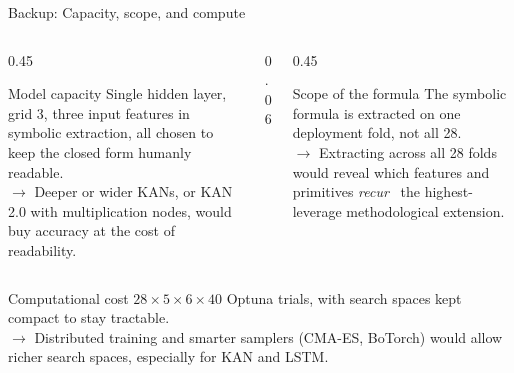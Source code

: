 \documentclass[aspectratio=169, t]{beamer}
\begin{document}

\begin{frame}{Backup: Capacity, scope, and compute}
\vspace{-0.4em}

\begin{columns}[T]
\begin{column}{0.45\textwidth}
{
\begin{block}{Model capacity}
\scriptsize
Single hidden layer, grid 3, three input features in symbolic extraction, all chosen to keep the closed form humanly readable.\\[3pt]
\textbf{$\rightarrow$} Deeper or wider KANs, or KAN 2.0 with multiplication nodes, would buy accuracy at the cost of readability.
\end{block}
}
\end{column}
\begin{column}{0.06\textwidth}\hfill\end{column}
\begin{column}{0.45\textwidth}
{
\begin{block}{Scope of the formula}
\scriptsize
The symbolic formula is extracted on one deployment fold, not all 28.\\[3pt]
\textbf{$\rightarrow$} Extracting across all 28 folds would reveal which features and primitives \emph{recur} \textemdash\ the highest-leverage methodological extension.
\end{block}
}
\end{column}
\end{columns}

\vspace{0.6em}

\begin{center}
\begin{minipage}{0.62\textwidth}
{
\begin{block}{Computational cost}
\scriptsize
$28 \times 5 \times 6 \times 40$ Optuna trials, with search spaces kept compact to stay tractable.\\[3pt]
\textbf{$\rightarrow$} Distributed training and smarter samplers (CMA-ES, BoTorch) would allow richer search spaces, especially for KAN and LSTM.
\end{block}
}
\end{minipage}
\end{center}

\end{frame}
\end{document}
